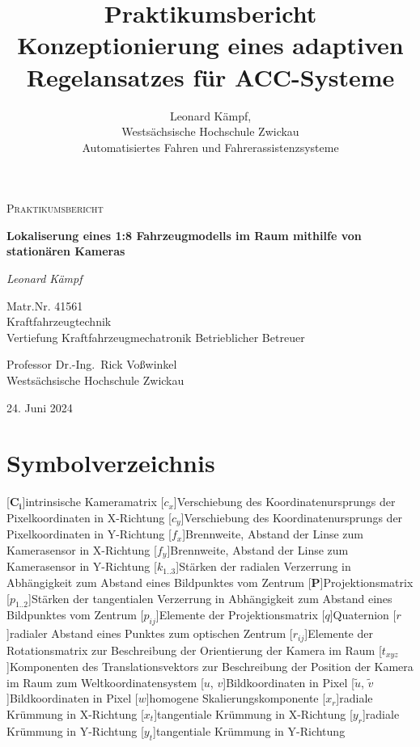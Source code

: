 \documentclass[ngerman]{article}    %
\title{Praktikumsbericht\\ %
      Konzeptionierung eines adaptiven Regelansatzes für ACC-Systeme}
\author{Leonard Kämpf, \\
Westsächsische Hochschule Zwickau\\
Automatisiertes Fahren und Fahrerassistenzsysteme}   %
\theoremstyle{definition}
\begin{document}
\begin{titlepage}
	\centering
	{\scshape\Large Praktikumsbericht\par}
	\vspace{1.5cm}
	{\huge\bfseries Lokaliserung eines 1:8 Fahrzeugmodells im Raum mithilfe von stationären Kameras\par}
	\vspace{2cm}
	{\LARGE\itshape Leonard Kämpf\par}
	\vspace{.3cm}
	{Matr.Nr. 41561\\Kraftfahrzeugtechnik \\ Vertiefung Kraftfahrzeugmechatronik}
	\vfill
	Betrieblicher Betreuer\par
	\vspace{3cm}
	\large{Professor Dr.-Ing.~Rick {Voßwinkel}}\\
	\small{Westsächsische Hochschule Zwickau}

 	\vfill

	{\large 24. Juni 2024\par}
\end{titlepage}       %
\newpage
\tableofcontents         %



\newpage
\section*{Symbolverzeichnis}
\begin{acronym}[MMM]
\setlength{\itemsep}{-\parsep}
[$\mathbf{C_i}$]{intrinsische Kameramatrix}
[$c_{x}$]{Verschiebung des Koordinatenursprungs der Pixelkoordinaten in X-Richtung}
[$c_{y}$]{Verschiebung des Koordinatenursprungs der Pixelkoordinaten in Y-Richtung}
[$f_{x}$]{Brennweite, Abstand der Linse zum Kamerasensor in X-Richtung}
[$f_{y}$]{Brennweite, Abstand der Linse zum Kamerasensor in Y-Richtung}
[$k_{1..3}$]{Stärken der radialen Verzerrung in Abhängigkeit zum Abstand eines Bildpunktes vom Zentrum}
[$\textbf{P}$]{Projektionsmatrix}
[$p_{1..2}$]{Stärken der tangentialen Verzerrung in Abhängigkeit zum Abstand eines Bildpunktes vom Zentrum}
[$p_{ij}$]{Elemente der Projektionsmatrix}
[$q$]{Quaternion}
[$r$]{radialer Abstand eines Punktes zum optischen Zentrum}
[$r_{ij}$]{Elemente der Rotationsmatrix zur Beschreibung der Orientierung der Kamera im Raum}
[$t_{xyz}$]{Komponenten des Translationsvektors zur Beschreibung der Position der Kamera im Raum zum Weltkoordinatensystem}
[$u$, $v$]{Bildkoordinaten in Pixel}
[$\tilde{u}$, $\tilde{v}$]{Bildkoordinaten in Pixel}
[$w$]{homogene Skalierungskomponente}
[$x_{r}$]{radiale Krümmung in X-Richtung}
[$x_{t}$]{tangentiale Krümmung in X-Richtung}
[$y_{r}$]{radiale Krümmung in Y-Richtung}
[$y_{t}$]{tangentiale Krümmung in Y-Richtung}

\end{acronym}
\newpage
\end{document}
